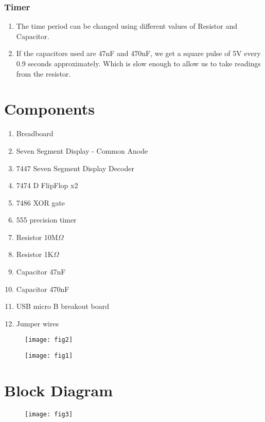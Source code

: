 \documentclass{article}
\begin{document}
\subsubsection*{Timer}
\begin{enumerate}
    \item The time period can be changed using different values of Resistor and Capacitor.
    \item If the capacitors used are 47nF and 470nF, we get a square pulse of 5V every 0.9 seconds approximately. Which is slow enough to allow us to take readings from the resistor.
\end{enumerate}

 

\section*{Components}
\begin{enumerate}
    \item Breadboard
    \item Seven Segment Display - Common Anode
    \item 7447 Seven Segment Display Decoder
    \item 7474 D FlipFlop x2
    \item 7486 XOR gate
    \item 555 precision timer
    \item Resistor 10M$\Omega$
    \item Resistor 1K$\Omega$
    \item Capacitor 47nF
    \item Capacitor 470nF
    \item USB micro B breakout board
    \item Jumper wires
\end{enumerate}

\begin{figure}[ht]
	\centering
	\texttt{[image: fig2]}
	\label{fig:view}
\end{figure}
\FloatBarrier

\begin{figure}[ht]
	\centering
	\texttt{[image: fig1]}
	\label{fig:view}
\end{figure}
\FloatBarrier

\section*{Block Diagram}

\begin{figure}[ht]
	\centering
	\texttt{[image: fig3]}
	\label{fig:view}
\end{figure}
\FloatBarrier
\end{document}
